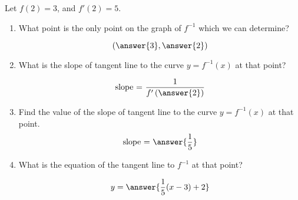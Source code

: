 \documentclass{ximera}
\author{Steven Gubkin\and Nela Lakos}
\begin{document}
\begin{exercise}

Let $f(2)=3$, and $f'(2) = 5$. 
\begin{enumerate}
\item What point is the only  point on the graph of $f^{-1}$ which we can determine?

\[
\left(\answer{3},\answer{2}\right)
\]
\item What is the slope of tangent line to the curve $y=f^{-1}(x)$ at that point?

\[
\text{slope = }\frac{1}{f'\left(\answer{2}\right)}
\]
\item Find the value of the slope of tangent line to the curve $y=f^{-1}(x)$ at that point.
\[
\text{slope = }\answer{\frac{1}{5}}
\]
  \item What is the equation of the tangent line to $f^{-1}$ at that point?
\begin{prompt}
\[
y = \answer{\frac{1}{5}(x-3)+2}
\]
\end{prompt}
\end{enumerate}
\end{exercise}
\end{document}
